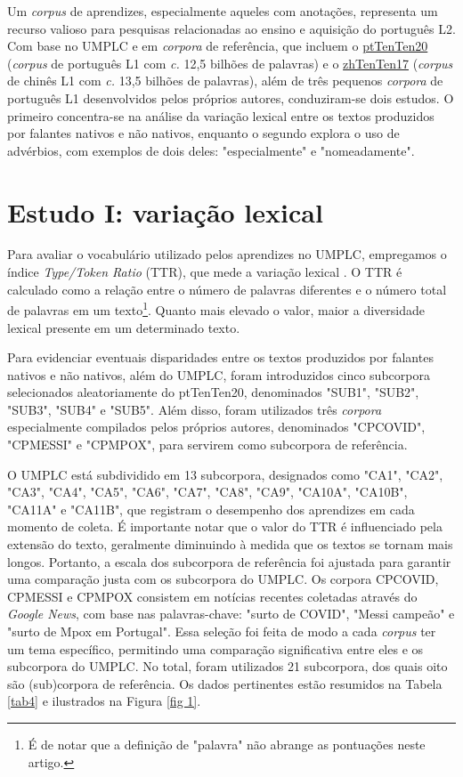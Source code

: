 \documentclass[portuguese]{textolivre}
\begin{document}
Um \textit{corpus} de aprendizes, especialmente aqueles com anotações, representa um recurso valioso para pesquisas relacionadas ao ensino e aquisição do português L2. Com base no UMPLC e em \textit{corpora} de referência, que incluem o \href{https://www.sketchengine.eu/pttenten-portuguese-corpus/}{ptTenTen20} (\textit{corpus} de português L1 com \textit{c.} 12,5 bilhões de palavras) e o \href{https://www.sketchengine.eu/zhtenten-chinese-corpus/}{zhTenTen17} (\textit{corpus} de chinês L1 com \textit{c.} 13,5 bilhões de palavras), além de três pequenos \textit{corpora} de português L1 desenvolvidos pelos próprios autores, conduziram-se dois estudos. O primeiro concentra-se na análise da variação lexical entre os textos produzidos por falantes nativos e não nativos, enquanto o segundo explora o uso de advérbios, com exemplos de dois deles: "especialmente" e "nomeadamente".

\section{Estudo I: variação lexical }
Para avaliar o vocabulário utilizado pelos aprendizes no UMPLC, empregamos o índice \textit{Type/Token Ratio} (TTR), que mede a variação lexical \cite{wolfe1998}. O TTR é calculado como a relação entre o número de palavras diferentes e o número total de palavras em um texto\footnote{É de notar que a definição de "palavra" não abrange as pontuações neste artigo.}.  Quanto mais elevado o valor, maior a diversidade lexical presente em um determinado texto. 

Para evidenciar eventuais disparidades entre os textos produzidos por falantes nativos e não nativos, além do UMPLC, foram introduzidos cinco subcorpora selecionados aleatoriamente do ptTenTen20, denominados "SUB1", "SUB2", "SUB3", "SUB4" e "SUB5". Além disso, foram utilizados três \textit{corpora} especialmente compilados pelos próprios autores, denominados "CPCOVID", "CPMESSI" e "CPMPOX", para servirem como subcorpora de referência.

O UMPLC está subdividido em 13 subcorpora, designados como "CA1", "CA2", "CA3", "CA4", "CA5", "CA6", "CA7", "CA8", "CA9", "CA10A", "CA10B", "CA11A" e "CA11B", que registram o desempenho dos aprendizes em cada momento de coleta. É importante notar que o valor do TTR é influenciado pela extensão do texto, geralmente diminuindo à medida que os textos se tornam mais longos. Portanto, a escala dos subcorpora de referência foi ajustada para garantir uma comparação justa com os subcorpora do UMPLC.
Os corpora CPCOVID, CPMESSI e CPMPOX consistem em notícias recentes coletadas através do \textit{Google News}, com base nas palavras-chave: "surto de COVID", "Messi campeão" e "surto de Mpox em Portugal". Essa seleção foi feita de modo a cada \textit{corpus} ter um tema específico, permitindo uma comparação significativa entre eles e os subcorpora do UMPLC. No total, foram utilizados 21 subcorpora, dos quais oito são (sub)corpora de referência.
Os dados pertinentes estão resumidos na Tabela \ref{tab4} e ilustrados na Figura \ref{fig 1}.
\end{document}
